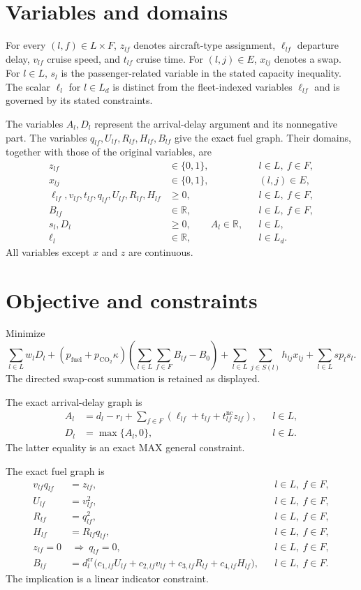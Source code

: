 \documentclass{article}
\begin{document}
\section{Variables and domains}
For every $(l,f)\in L\times F$, $z_{lf}$ denotes aircraft-type assignment, $\ell_{lf}$ departure delay, $v_{lf}$ cruise speed, and $t_{lf}$ cruise time. For $(l,j)\in E$, $x_{lj}$ denotes a swap. For $l\in L$, $s_l$ is the passenger-related variable in the stated capacity inequality. The scalar $\ell_l$ for $l\in L_d$ is distinct from the fleet-indexed variables $\ell_{lf}$ and is governed by its stated constraints.

The variables $A_l,D_l$ represent the arrival-delay argument and its nonnegative part. The variables $q_{lf},U_{lf},R_{lf},H_{lf},B_{lf}$ give the exact fuel graph. Their domains, together with those of the original variables, are
\begin{align}
 z_{lf}&\in\{0,1\}, & &l\in L,\ f\in F,\\
 x_{lj}&\in\{0,1\}, & &(l,j)\in E,\\
 \ell_{lf},v_{lf},t_{lf},q_{lf},U_{lf},R_{lf},H_{lf}&\geq0,
 &&l\in L,\ f\in F,\\
 B_{lf}&\in\mathbb R, &&l\in L,\ f\in F,\\
 s_l,D_l&\geq0,\qquad A_l\in\mathbb R, &&l\in L,\\
 \ell_l&\in\mathbb R, &&l\in L_d.
\end{align}
All variables except $x$ and $z$ are continuous.

\section{Objective and constraints}
Minimize
\begin{equation}
 \sum_{l\in L}w_lD_l
 +(p_{\mathrm{fuel}}+p_{\mathrm{CO}_2}\kappa)
 \left(\sum_{l\in L}\sum_{f\in F}B_{lf}-B_0\right)
 +\sum_{l\in L}\sum_{j\in S(l)}h_{lj}x_{lj}
 +\sum_{l\in L}sp_ls_l.
\end{equation}
The directed swap-cost summation is retained as displayed.

The exact arrival-delay graph is
\begin{align}
 A_l&=d_l-r_l+\sum_{f\in F}
 (\ell_{lf}+t_{lf}+t_{lf}^{\mathrm{nc}}z_{lf}), &&l\in L,\\
 D_l&=\max\{A_l,0\}, &&l\in L.
\end{align}
The latter equality is an exact MAX general constraint.

The exact fuel graph is
\begin{align}
 v_{lf}q_{lf}&=z_{lf}, &&l\in L,\ f\in F,\\
 U_{lf}&=v_{lf}^2, &&l\in L,\ f\in F,\\
 R_{lf}&=q_{lf}^2, &&l\in L,\ f\in F,\\
 H_{lf}&=R_{lf}q_{lf}, &&l\in L,\ f\in F,\\
 z_{lf}=0&\ \Longrightarrow\ q_{lf}=0, &&l\in L,\ f\in F,\\
 B_{lf}&=d_l^{\mathrm{cr}}\bigl(c_{1,lf}U_{lf}+c_{2,lf}v_{lf}
                 +c_{3,lf}R_{lf}+c_{4,lf}H_{lf}\bigr),
 &&l\in L,\ f\in F.
\end{align}
The implication is a linear indicator constraint.
\end{document}
